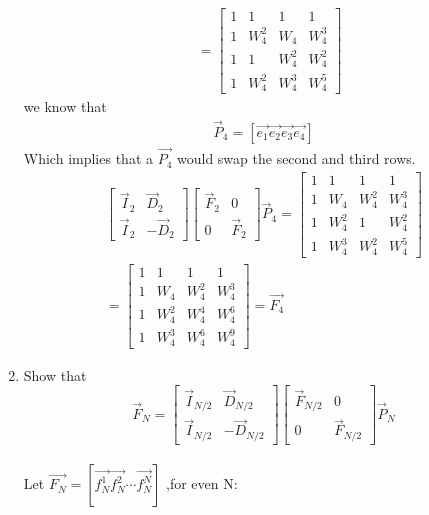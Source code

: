 \documentclass[journal,12pt,twocolumn]{IEEEtran}
\renewcommand\thesection{\arabic{section}}
\begin{document}
\begin{enumerate}[label=\arabic*.,ref=\thesection.\theenumi]
\begin{align}
\\&=\begin{bmatrix}
1 & 1&1&1\\
1 & W_4^2&W_4& W_4^3\\
1 & 1 & W_4^2&W_4^2 \\
1 & W_4^2 & W_4^3& W_4^5
\end{bmatrix} 
\end{align}
we know that 
\begin{align}
    \vec{P}_4=[\vec{e_1}\vec{e_2}\vec{e_3}\vec{e_4}]
\end{align}
Which implies that a $\vec{P_4}$ would swap the second and third rows.
\begin{align}
    \begin{bmatrix}
	\vec{I}_{2} & \vec{D}_{2} \\
\vec{I}_{2} & -\vec{D}_{2}
\end{bmatrix}
\begin{bmatrix}
\vec{F}_{2} & 0 \\
0 & \vec{F}_{2}
\end{bmatrix}
\vec{P}_{4}=\begin{bmatrix}
1 & 1&1&1\\
1 & W_4&W_4^2& W_4^3\\
1 & W_4^2 & 1&W_4^2 \\
1 & W_4^3 & W_4^2& W_4^5
\end{bmatrix}\\
= \begin{bmatrix}
1 & 1&1&1\\
1 & W_4&W_4^2& W_4^3\\
1 & W_4^2 & W_4^4&W_4^6 \\
1 & W_4^3 & W_4^6& W_4^9
\end{bmatrix}=\vec{F_4}
\end{align}
\item Show that 
\begin{equation}
\vec{F}_{N}=
\begin{bmatrix}
\vec{I}_{N/2} & \vec{D}_{N/2} \\
\vec{I}_{N/2} & -\vec{D}_{N/2}
\end{bmatrix}
\begin{bmatrix}
\vec{F}_{N/2} & 0 \\
0 & \vec{F}_{N/2}
\end{bmatrix}
\vec{P}_{N}
\end{equation}\\
\solution Let $\vec{F_N}=[\vec{f_N^1}\vec{f_N^2}\cdots\vec{f_N^N}]$
,for even N:\begin{align}

\end{align}
\end{enumerate}
\end{document}
